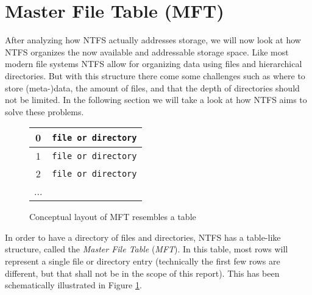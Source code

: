 \section{Master File Table (MFT)}
\label{sec:MFT}
After analyzing how NTFS actually addresses storage, we will now look at how NTFS organizes the now available and addressable storage space. Like most modern file systems NTFS allow for organizing data using files and hierarchical directories. But with this structure there come some challenges such as where to store (meta-)data, the amount of files, and that the depth of directories should not be limited. In the following section we will take a look at how NTFS aims to solve these problems.\\

\begin{figure}[h]
	\centering

		\begin{tabularx}{\columnwidth}{|cX|}
			\hline
			0 & \texttt{file or directory} \\
			\hline
			1 & \texttt{file or directory} \\
			\hline
			2 & \texttt{file or directory} \\
			\hline
			... & \\
			\hline
		\end{tabularx}
	
	\caption{Conceptual  layout of MFT resembles a table \label{fig:mft_concept}}
\end{figure}
In order to have a directory of files and directories, NTFS has a table-like structure, called the \textit{Master File Table} (\textit{MFT}). In this table, most rows will represent a single file or directory entry (technically the first few rows are different, but that shall not be in the scope of this report). This has been schematically illustrated in Figure \ref{fig:mft_concept}.\\
